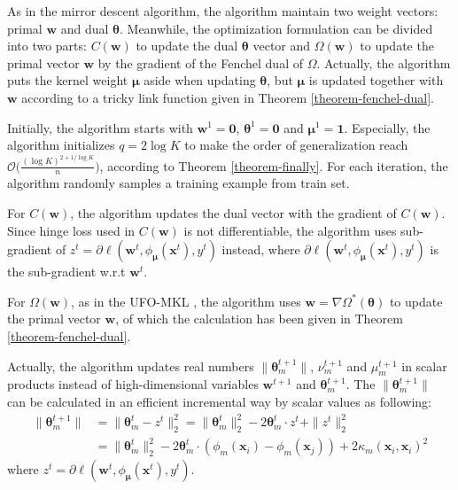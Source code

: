 \documentclass{article}
\begin{document}
 As in the mirror descent algorithm, the algorithm maintain two weight vectors: primal $\mathbf w$ and dual $\pmb{\theta}$.
 Meanwhile, the optimization formulation can be divided into two parts: $C(\mathbf w)$
 to update the dual $\pmb{\theta}$ vector and $\Omega(\mathbf w)$ to update the primal vector $\mathbf w$ by
 the gradient of the Fenchel dual of $\Omega$.
 Actually, the algorithm puts the kernel weight $\pmb{\mu}$ aside when updating $\pmb{\theta}$,
 but $\pmb{\mu}$ is updated together with $\mathbf w$ according to a tricky link function given in Theorem \ref{theorem-fenchel-dual}.

Initially, the algorithm starts with $\mathbf{w}^1=\mathbf{0}$, $\pmb{\theta}^1=\mathbf{0}$ and $\pmb{\mu}^1=\mathbf{1}$.
Especially, the algorithm initializes $q=2\log K$ to make the order of generalization reach
$\mathcal{O}\big(\frac{(\log K)^{2+1/\log K}}{n}\big)$, according to Theorem \ref{theorem-finally}.
For each iteration, the algorithm randomly samples a training example from train set.

For $C(\mathbf w)$, the algorithm updates the dual vector with the gradient of $C(\mathbf w)$.
Since hinge loss used in $C(\mathbf w)$ is not differentiable,
the algorithm uses sub-gradient of $z^t=\partial\ell(\mathbf w^t,\phi_{\bm \mu}(\mathbf{x}^t), y^t)$ instead,
where $\partial\ell(\mathbf w^t,\phi_{\bm \mu}(\mathbf{x}^t), y^t)$ is the sub-gradient w.r.t $\mathbf w^t$.

For $\Omega(\mathbf w)$, as in the UFO-MKL \cite{OrabonaL11},
the algorithm uses $\mathbf w=\nabla\Omega^\ast(\pmb{\theta})$ to update the primal vector $\mathbf w$,
of which the calculation has been given in Theorem \ref{theorem-fenchel-dual}.

Actually, the algorithm updates real numbers $\|\bm \theta_m^{t+1}\|$, $\nu_m^{t+1}$ and $\mu_m^{t+1}$ in scalar products instead of
high-dimensional variables $\mathbf w^{t+1}$ and $\bm \theta_m^{t+1}$.
The $\|\bm \theta_m^{t+1}\|$ can be calculated in an efficient incremental way by scalar values as following:
\begin{align*}
\|\pmb{\theta}_m^{t+1}\|
&=\|\pmb{\theta}_m^{t}-z^t\|_2^2
=\|\pmb{\theta}_m^{t}\|_2^2-2\pmb{\theta}_m^t \cdot z^t +\|z^t\|_2^2\\
&=\|\pmb{\theta}_m^{t}\|_2^2-2\pmb{\theta}_m^t \cdot (\phi_m(\mathbf{x}_i)-\phi_m(\mathbf{x}_j))
+ 2\kappa_m(\mathbf{x}_i, \mathbf{x}_i)^2
\end{align*}
where $z^t=\partial\ell(\mathbf w^t,\phi_{\bm \mu}(\mathbf{x}^t), y^t)$.
\end{document}
